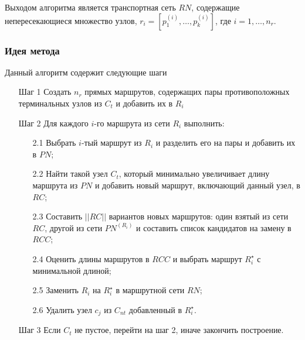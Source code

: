 Выходом алгоритма является транспортная сеть \( RN \), содержащие непересекающиеся множество узлов, 
\( r_{i} = [p_{1}^{(i)}, \dots, p_{k}^{(i)}] \), где \( i = 1, \dots, n_r \). 

\subsubsection{Идея метода}
Данный алгоритм содержит следующие шаги
\begin{enumerate}
    \item[Шаг 1] Создать \( n_r \) прямых маршрутов, содержащих пары противоположных терминальных 
        узлов из \( C_t \) и добавить их в \( R_i \)
    \item[Шаг 2] Для каждого \( i \)-го маршрута из сети \( R_i \) выполнить:
    \begin{enumerate}
        \item[2.1] Выбрать \( i \)-тый маршрут из \( R_i \) и разделить его на пары и добавить их в \( PN \);
        \item[2.2] Найти такой узел \( C_t \), который минимально увеличивает длину маршрута из \( PN \) и 
            добавить новый маршрут, включающий данный узел, в \( RC \);
        \item[2.3] Составить \( ||RC|| \) вариантов новых маршрутов: один взятый из сети \( RC \), другой 
            из сети \( PN^{(R_{i})} \) и составить список кандидатов на замену в \( RCC \);
        \item[2.4] Оценить длины маршрутов в \( RCC \) и выбрать маршрут \( R^{\star}_{i} \) 
            с минимальной длиной;
        \item[2.5] Заменить \( R_{i} \) на $R^{\star}_{i}$ в маршрутной сети \( RN \);
        \item[2.6] Удалить узел \( c_{j} \) из \( C_{nt} \) добавленный в \( R^{\star}_{i} \). 
    \end{enumerate}
    \item[Шаг 3] Если \( C_t \) не пустое, перейти на шаг 2, иначе закончить построение.
\end{enumerate}

